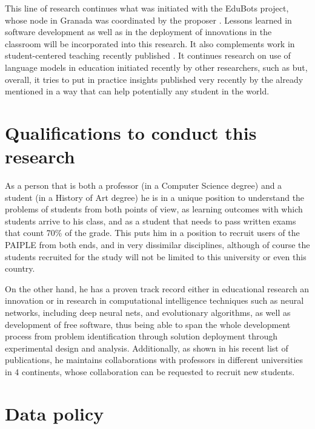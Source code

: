 \documentclass[a4paper,12pt]{article}
\begin{document}
This line of research continues what was initiated with the EduBots project,
whose node in Granada was coordinated by the proposer
\cite{DBLP:journals/eait/MereloCMBAGT24,DBLP:conf/hci/MoraGBCG21}. Lessons
learned in software development as well as in the deployment of innovations in
the classroom will be incorporated into this research. It also complements work
in student-centered teaching recently published \cite{10481/89811}. It continues
research on use of language models in education initiated recently by other
researchers, such as \cite{li2024adaptinglargelanguagemodels} but, overall, it
tries to put in practice insights published  very recently by the already mentioned
\cite{ruiz2024learning} in a way that can help potentially any student in the world.


\section{Qualifications to conduct this research}

As a person that is both a professor (in a Computer Science degree) and a
student (in a History of Art degree) he is in a unique position to understand
the problems of students from both points of view, as learning outcomes with
which students arrive to his class, and as a student that needs to pass written
exams that count 70\% of the grade. This puts him in a position to recruit users
of the PAIPLE from both ends, and in very dissimilar disciplines, although of
course the students recruited for the study will not be limited to this
university or even this country.

On the other hand, he has a proven track record either in educational research
an innovation
\cite{DBLP:conf/ijcci/ValdezGHS17,DBLP:journals/eait/MereloCMBAGT24} or in
research in computational intelligence techniques such as neural networks,
including deep neural nets, and evolutionary algorithms, as well as development
of free software, thus being able to span the whole development process from
problem identification through solution deployment through experimental design
and analysis. Additionally, as shown in his recent list of publications, he
maintains collaborations with professors in different universities in 4
continents, whose collaboration can be requested to recruit new students.

\section{Data policy}
\end{document}
